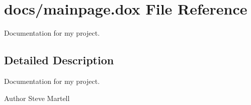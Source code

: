 \hypertarget{mainpage_8dox}{}\section{docs/mainpage.dox File Reference}
\label{mainpage_8dox}


Documentation for my project.  




\subsection{Detailed Description}
Documentation for my project. 

\begin{DoxyAuthor}{Author}
Steve Martell 
\end{DoxyAuthor}
